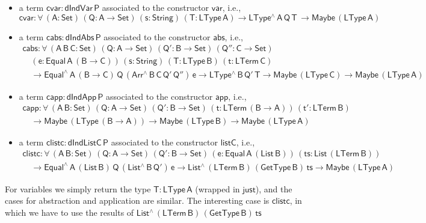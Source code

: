 \documentclass[9pt]{entcs}
\begin{document}
\begin{itemize}
\item a term $\mathsf{cvar : dIndVar\,P}$ associated to the constructor $\mathsf{var}$, i.e.,
\[
  \mathsf{cvar : \forall\, (A : Set)\, (Q : A \to Set)\, (s : String)\, (T : LType\, A) 
      \to LType^{\wedge} \, A\, Q\, T\, \to Maybe\, (LType\, A)}
\]
\item a term $\mathsf{cabs : dIndAbs\,P}$ associated to the constructor $\mathsf{abs}$, i.e.,
\[
\begin{array}{l}
    \mathsf{cabs : \forall\, (A \, B\, C: Set)\, (Q : A \to Set)\, (Q' : B \to Set)\, (Q'' : C \to Set)} \\
    \quad\mathsf{(e : Equal\, A\, (B \to C))\, (s : String)\, (T : LType\, B)\, (t : LTerm \, C)} \\ 
    \quad\mathsf{ 
      \to Equal^{\wedge}\, A\, (B \to C)\, Q\, (Arr^{\wedge}\, B\, C\, Q'\, Q'')\, e
      \to LType^{\wedge} \, B\, Q'\, T
      \to Maybe\, (LType\,C) \to Maybe\, (LType\, A)}
\end{array}
\]
\item a term $\mathsf{capp : dIndApp\,P}$ associated to the constructor $\mathsf{app}$, i.e.,
\[
\begin{array}{l}
    \mathsf{capp : \forall\, (A \, B : Set)\, (Q : A \to Set)\, (Q' : B \to Set)\, 
      (t : LTerm\, (B \to A))\, (t' : LTerm\, B)} \\ 
    \quad\mathsf{
      \to Maybe\, (LType\, (B \to A))
      \to Maybe\, (LType\, B)
      \to Maybe\, (LType\, A)
    }
\end{array}
\]
\item a term $\mathsf{clistc : dIndListC\,P}$ associated to the constructor $\mathsf{listC}$, i.e.,
\[
\begin{array}{l}
    \mathsf{clistc : \forall\, (A \, B : Set)\, (Q : A \to Set)\, (Q' : B \to Set)\,
      (e : Equal\, A\, (List\, B))\, (ts : List\, (LTerm\, B))} \\ 
    \quad\mathsf{
      \to Equal^{\wedge}\, A\, (List\,B) \, Q\, (List^{\wedge}\, B\, Q')\, e
      \to List^{\wedge}\, (LTerm\, B)\, (GetType\, B)\, ts
      \to Maybe\, (LType\, A)
    }
\end{array}
\]
\end{itemize}
For variables we simply return the type $\mathsf{T : LType\, A}$ (wrapped in $\mathsf{just}$), 
and the cases for abstraction and application are similar.
The interesting case is $\mathsf{clistc}$, in which we have to use 
the results of $\mathsf{List^{\wedge}\, (LTerm\, B)\, (GetType\, B)\, ts}$
\end{document}

